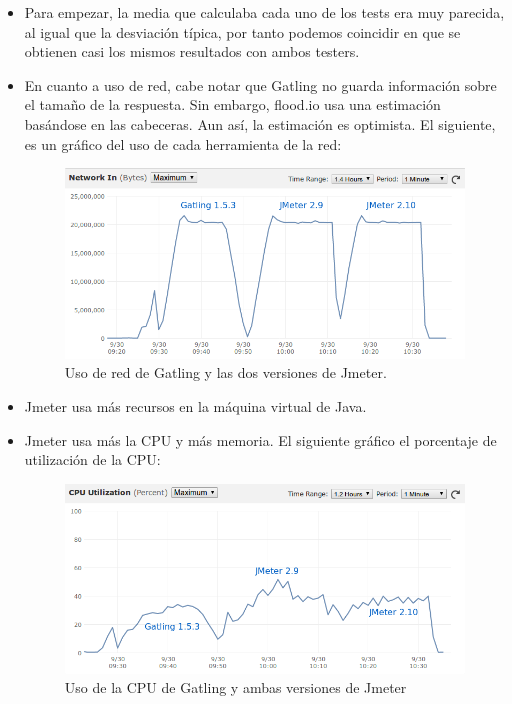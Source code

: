 \begin{itemize}
	\begin{itemize}
		\item Para empezar, la media que calculaba cada uno de los tests era muy parecida, al igual que la desviación típica, por tanto podemos coincidir en que se obtienen casi los mismos resultados con ambos testers.
		\item En cuanto a uso de red, cabe notar que Gatling no guarda información sobre el tamaño de la respuesta. Sin embargo, flood.io usa una estimación basándose en las cabeceras. Aun así, la estimación es optimista. El siguiente, es un gráfico del uso de cada herramienta de la red:\\
		\begin{figure}[H]
			\centering
			\includegraphics[width=0.7\linewidth]{Gatling-Jmeter-Net}
			\caption[Uso de red]{Uso de red de Gatling y las dos versiones de Jmeter.}
			\label{fig:Gatling-Jmeter-Net}
		\end{figure}

		\item Jmeter usa más recursos en la máquina virtual de Java.
		
		\item Jmeter usa más la CPU y más memoria. El siguiente gráfico el porcentaje de utilización de la CPU:\\
		\begin{figure}[H]
			\centering
			\includegraphics[width=0.7\linewidth]{UsoCPU-JmeterGatling}
			\caption[Uso CPU]{Uso de la CPU de Gatling y ambas versiones de Jmeter}
			\label{fig:UsoCPU-JmeterGatling}
		\end{figure}


\end{itemize}
\end{itemize}
